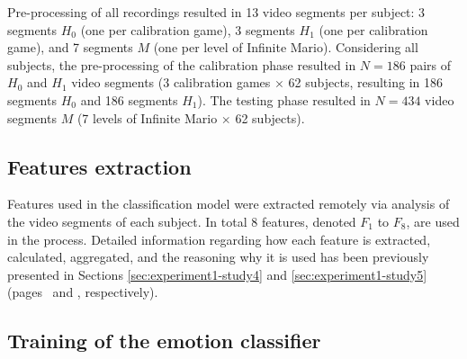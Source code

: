 Pre-processing of all recordings resulted in 13 video segments per subject: 3 segments $H_0$ (one per calibration game), 3 segments $H_1$ (one per calibration game), and 7 segments $M$ (one per level of Infinite Mario). Considering all subjects, the pre-processing of the calibration phase resulted in $N=186$ pairs of $H_0$ and $H_1$ video segments (3 calibration games $\times$ 62 subjects, resulting in 186 segments $H_0$ and 186 segments $H_1$). The testing phase resulted in $N=434$ video segments $M$ (7 levels of Infinite Mario $\times$ 62 subjects).

\subsection{Features extraction}

Features used in the classification model were extracted remotely via analysis of the video segments of each subject. In total 8 features, denoted $F_1$ to $F_8$, are used in the process. Detailed information regarding how each feature is extracted, calculated, aggregated, and the reasoning why it is used has been previously presented in Sections \ref{sec:experiment1-study4} and \ref{sec:experiment1-study5} (pages \pageref{sec:experiment1-study4}\ and \pageref{sec:experiment1-study5}, respectively).


\subsection{Training of the emotion classifier}

